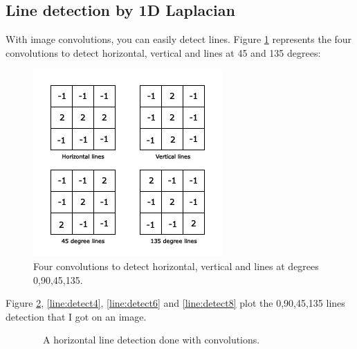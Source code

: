 \subsection{Line detection by 1D Laplacian}
With image convolutions, you can easily detect lines. Figure \ref{line:detect1} represents the  four convolutions to detect horizontal, vertical and lines at 45 and 135 degrees:
\begin{figure}[!ht]
	\centering
	\includegraphics[width=.4\textwidth]{6DL/figures/line}
	\caption{Four convolutions to detect horizontal, vertical and lines at degrees 0,90,45,135.}
	\label{line:detect1}
\end{figure}
Figure \ref{line:detect2}, \ref{line:detect4}, \ref{line:detect6} and \ref{line:detect8} plot the  0,90,45,135 lines detection that I got on an image.
\begin{figure}[!ht]
	\centering
	\caption{~~A horizontal line detection done with convolutions.}
	\label{line:detect2}
\end{figure}

